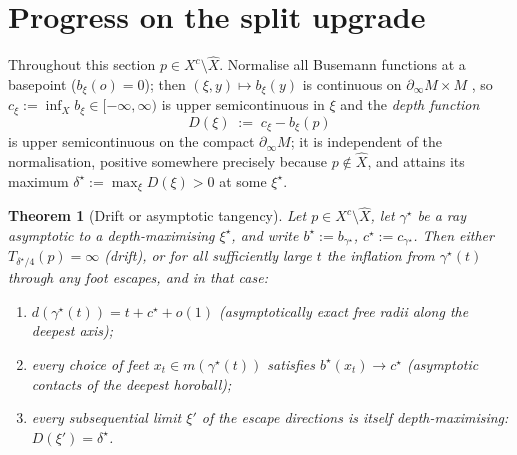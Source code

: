 \documentclass[11pt]{article}
\newtheorem{theorem}{Theorem}[section]
\theoremstyle{remark}
\newcommand{\X}{X}
\newcommand{\Xhat}{\widehat{\X}}
\newcommand{\bdry}{\partial_{\infty}}
\begin{document}
\section{Progress on the split upgrade}\label{sec:upgrade}

Throughout this section $p\in\X^{c}\setminus\Xhat$. Normalise all
Busemann functions at a basepoint ($b_{\xi}(o)=0$); then
$(\xi,y)\mapsto b_{\xi}(y)$ is continuous on $\bdry M\times M$
\cite[II.8]{BH}, so $c_{\xi}:=\inf_{\X}b_{\xi}\in[-\infty,\infty)$ is
upper semicontinuous in $\xi$ and the \emph{depth function}
\[
D(\xi)\;:=\;c_{\xi}-b_{\xi}(p)
\]
is upper semicontinuous on the compact $\bdry M$; it is independent of
the normalisation, positive somewhere precisely because
$p\notin\Xhat$, and attains its maximum
$\delta^{\star}:=\max_{\xi}D(\xi)>0$ at some $\xi^{\star}$.

\begin{theorem}[Drift or asymptotic tangency]\label{thm:dichotomy}
Let $p\in\X^{c}\setminus\Xhat$, let $\gamma^{\star}$ be a ray
asymptotic to a depth-maximising $\xi^{\star}$, and write
$b^{\star}:=b_{\gamma^{\star}}$, $c^{\star}:=c_{\gamma^{\star}}$.
Then either $T_{\delta^{\star}/4}(p)=\infty$ (\emph{drift}), or for
all sufficiently large $t$ the inflation from $\gamma^{\star}(t)$
through any foot escapes, and in that case:
\begin{enumerate}[label=(\alph*)]
\item $d(\gamma^{\star}(t))=t+c^{\star}+o(1)$ (asymptotically exact
free radii along the deepest axis);
\item every choice of feet $x_{t}\in m(\gamma^{\star}(t))$ satisfies
$b^{\star}(x_{t})\to c^{\star}$ (asymptotic contacts of the deepest
horoball);
\item every subsequential limit $\xi'$ of the escape directions is
itself depth-maximising: $D(\xi')=\delta^{\star}$.
\end{enumerate}
\end{theorem}
\end{document}
